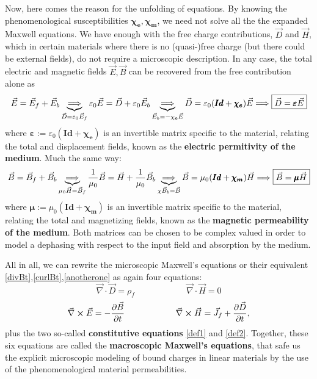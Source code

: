\documentclass[11pt, a4paper, twoside]{article} %
\begin{document}
Now, here comes the reason for the unfolding of equations. By knowing the phenomenological susceptibilities $\pmb{\chi_e},\pmb{\chi_m}$, we need not solve all the the expanded Maxwell equations. We have enough with the free charge contributions, $\vec{D}$ and $\vec{H}$, which in certain materials where there is no (quasi-)free charge (but there could be external fields), do not require a microscopic description. In any case, the total electric and magnetic fields $\vec{E},\vec{B}$ can be recovered from the free contribution alone as
\begin{equation}\label{def1}
\vec{E}=\vec{E}_f+\vec{E}_b \underbrace{\Longrightarrow}_{\vec{D}=\varepsilon_0 \vec{E}_f} \varepsilon_0\vec{E}=\vec{D}+\varepsilon_0\vec{E}_b\underbrace{\Longrightarrow}_{\vec{E}_b=-{\bf \chi_e}\vec{E}} \vec{D}=\varepsilon_0(\pmb{Id}+\pmb{\chi_e})\vec{E} \Longrightarrow \boxed{\vec{D}=\pmb{\varepsilon}\vec{E}}
\end{equation} 
where $\pmb{\varepsilon}:=\varepsilon_0(\pmb{Id}+\pmb{\chi_e})$ is an invertible matrix specific to the material, relating the total and displacement fields, known as the {\bf electric permitivity of the medium}. Much the same way:
\begin{equation}\label{def2}
\vec{B}=\vec{B}_f+\vec{B}_b \underbrace{\Longrightarrow}_{\mu_0\vec{H}=\vec{B}_f} \frac{1}{\mu_0}\vec{B}=\vec{H}+\frac{1}{\mu_0}\vec{B}_b\underbrace{\Longrightarrow}_{{\bf \chi} \vec{B}_b=\vec{B}} \vec{B}=\mu_0(\pmb{Id}+\pmb{\chi_m})\vec{H}\Longrightarrow \boxed{\vec{B}=\pmb{\mu} \vec{H}}
\end{equation} 
where $\pmb{\mu}:=\mu_0(\pmb{Id}+\pmb{\chi_m})$ is an invertible matrix specific to the material, relating the total and magnetizing fields, known as the {\bf magnetic permeability of the medium}. Both matrices can be chosen to be complex valued in order to model a dephasing with respect to the input field and absorption by the medium.

\noindent All in all, we can rewrite the microscopic Maxwell's equations or their equivalent {\small \eqref{divBt},\eqref{curlBt},\eqref{anotherone}} as again four equations: 
\begin{equation}\label{div2}
\vec{\nabla}\cdot \vec{D}=\rho_f \quad \quad \quad \quad \quad \quad \vec{\nabla}\cdot \vec{H}=0
\end{equation}
\begin{equation}\label{curl2}
\vec{\nabla}\cross \vec{E}=-\pdv{\vec{B}}{t} \quad \quad \quad \quad \quad \quad \vec{\nabla}\cross \vec{H}=\vec{J}_f+\pdv{\vec{D}}{t},
\end{equation}
plus the two so-called {\bf constitutive equations} \eqref{def1} and \eqref{def2}. Together, these six equations are called the {\bf macroscopic Maxwell's equations}, that safe us the explicit microscopic modeling of bound charges in linear materials by the use of the phenomenological material permeabilities.
\end{document}
